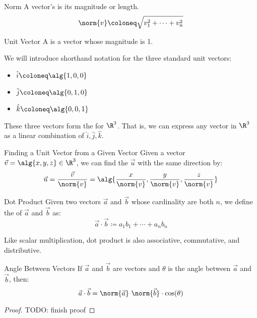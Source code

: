\documentclass[12pt]{report}
\begin{document}
\begin{dfnbox}{Norm}{}
    A vector's  is its magnitude or length.
    \tcblower
    \[ \norm{v} \coloneq \sqrt{v_1^2 + \cdots + v_n^2} \]
\end{dfnbox}

\begin{dfnbox}{Unit Vector}{}
    A  is a vector whose magnitude is 1.
\end{dfnbox}

We will introduce shorthand notation for the three standard unit vectors:
\begin{itemize}
    \item $\hat{i} \coloneq \alg{1,0,0}$
    \item $\hat{j} \coloneq \alg{0,1,0}$
    \item $\hat{k} \coloneq \alg{0,0,1}$
\end{itemize}
These three vectors form the  for $\R^3$. That is, we can express any vector in $\R^3$ as a linear combination of $\hat{i}, \hat{j}, \hat{k}$.

\begin{tecbox}{Finding a Unit Vector from a Given Vector}{}
    Given a vector $\vec{v} = \alg{x, y, z} \in \R^3$, we can find the  $\vec{u}$ with the same direction by:
    \[ \vec{u} = \frac{\vec{v}}{\norm{v}} = \alg{\frac{x}{\norm{v}}, \frac{y}{\norm{v}}, \frac{z}{\norm{v}}} \]
\end{tecbox}

\begin{dfnbox}{Dot Product}{}
    Given two vectors $\vec{a}$ and $\vec{b}$ whose cardinality are both $n$, we define the  of $\vec{a}$ and $\vec{b}$ as:
    \[ \vec{a} \cdot \vec{b} \coloneq a_1b_1 + \cdots + a_nb_n \]
\end{dfnbox}

Like scalar multiplication, dot product is also associative, commutative, and distributive.

\begin{thmbox}{Angle Between Vectors}{}
    If $\vec{a}$ and $\vec{b}$ are vectors and $\theta$ is the angle between $\vec{a}$ and $\vec{b}$, then:
    \[ \vec{a} \cdot \vec{b} = \norm{\vec{a}} \ \norm{\vec{b}} \cdot \cos(\theta) \]
    \tcblower
    \begin{proof}
        TODO: finish proof
    \end{proof}
\end{thmbox}
\end{document}
